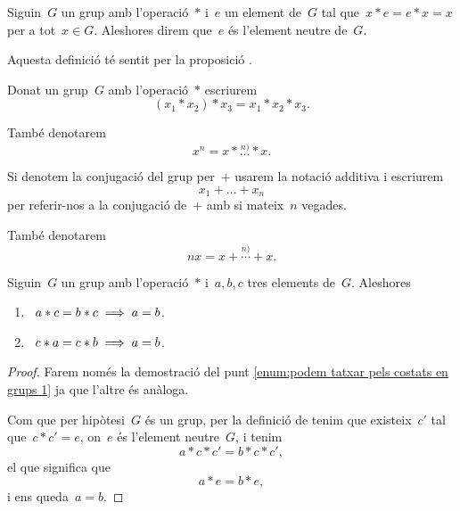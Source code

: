 \documentclass[../../main.tex]{subfiles}
\begin{document}
    \begin{definition}
        \label{def:l'element neutre del grup}
        Siguin~\(G\) un grup amb l'operació~\(\ast\) i~\(e\) un element de~\(G\) tal que~\(x\ast e=e\ast x=x\) per a tot~\(x\in G\).
        Aleshores direm que~\(e\) és l'element neutre de~\(G\).

        Aquesta definició té sentit per la proposició .
    \end{definition}
    \begin{notation}
        \label{notation:potencies per l'operació repetida en un grup}
        Donat un grup~\(G\) amb l'operació~\(\ast\) escriurem
        \[
            (x_{1}\ast x_{2})\ast x_{3}=x_{1}\ast x_{2}\ast x_{3}.
        \]

        També denotarem
        \[
            x^{n}=x\ast\overset{n)}{\dots}\ast x.
        \]

        Si denotem la conjugació del grup per~\(+\) usarem la notació additiva i escriurem
        \[
            x_{1}+\dots+x_{n}
        \]
        per referir-nos a la conjugació de~\(+\) amb si mateix~\(n\) vegades.

        També denotarem
        \[
            nx=x+\overset{n)}{\cdots}+ x.
        \]
    \end{notation}
    \begin{proposition}
        \label{prop:podem tatxar pels costats en grups}
        Siguin~\(G\) un grup amb l'operació~\(\ast\) i~\(a,b,c\) tres elements de~\(G\).
        Aleshores
        \begin{enumerate}
            \item\label{enum:podem tatxar pels costats en grups 1}~\(a\ast c=b\ast c\implies a=b\).
            \item\label{enum:podem tatxar pels costats en grups 2}~\(c\ast a=c\ast b\implies a=b\).
        \end{enumerate}
        \begin{proof}
            Farem només la demostració del punt \eqref{enum:podem tatxar pels costats en grups 1} ja que l'altre és anàloga.

            Com que per hipòtesi~\(G\) és un grup, per la definició de  tenim que existeix~\(c'\) tal que~\(c\ast c'=e\), on~\(e\) és l'element neutre~\(G\), i tenim
            \[
                a\ast c\ast c'=b\ast c\ast c',
            \]
            el que significa que
            \[
                a\ast e=b\ast e,
            \]
            i ens queda~\(a=b\).
        \end{proof}
    \end{proposition}
\end{document}

